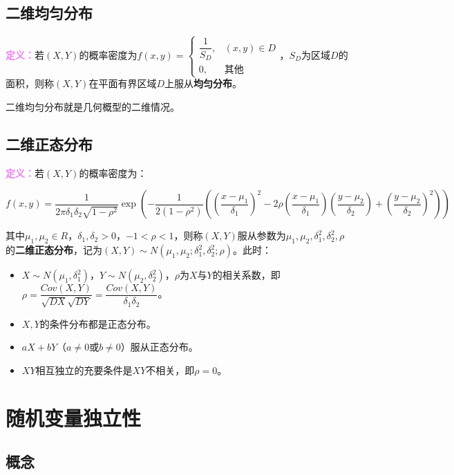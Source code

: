 \documentclass[UTF8, 12pt]{ctexart}
\begin{document}
\subsection{二维均匀分布}

\textcolor{violet}{\textbf{定义：}}若$(X,Y)$的概率密度为$f(x,y)=\left\{\begin{array}{ll}
    \dfrac{1}{S_D}, & (x,y)\in D \\
    0, & \text{其他}
\end{array}\right.$，$S_D$为区域$D$的面积，则称$(X,Y)$在平面有界区域$D$上服从\textbf{均匀分布}。

二维均匀分布就是几何概型的二维情况。

\subsection{二维正态分布}

\textcolor{violet}{\textbf{定义：}}若$(X,Y)$的概率密度为：

{\fontsize{8.25pt}{10pt}$f(x,y)=\dfrac{1}{2\pi\delta_1\delta_2\sqrt{1-\rho^2}}\exp\left(-\dfrac{1}{2(1-\rho^2)}\left(\left(\dfrac{x-\mu_1}{\delta_1}\right)^2-2\rho\left(\dfrac{x-\mu_1}{\delta_1}\right)\left(\dfrac{y-\mu_2}{\delta_2}\right)+\left(\dfrac{y-\mu_2}{\delta_2}\right)^2\right)\right)$}

其中$\mu_1,\mu_2\in R$，$\delta_1,\delta_2>0$，$-1<\rho<1$，则称$(X,Y)$服从参数为$\mu_1,\mu_2,\delta_1^2,\delta_2^2,\rho$的\textbf{二维正态分布}，记为$(X,Y)\sim N(\mu_1,\mu_2;\delta_1^2,\delta_2^2;\rho)$。此时：

\begin{itemize}
    \item $X\sim N(\mu_1,\delta_1^2)$，$Y\sim N(\mu_2,\delta_2^2)$，$\rho$为$X$与$Y$的相关系数，即$\rho=\dfrac{Cov(X,Y)}{\sqrt{DX}\sqrt{DY}}=\dfrac{Cov(X,Y)}{\delta_1\delta_2}$。
    \item $X,Y$的条件分布都是正态分布。
    \item $aX+bY$（$a\neq0$或$b\neq0$）服从正态分布。
    \item $XY$相互独立的充要条件是$XY$不相关，即$\rho=0$。
\end{itemize}

\section{随机变量独立性}

\subsection{概念}
\end{document}
